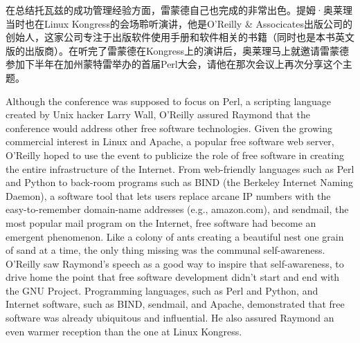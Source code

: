 \ifdefined\chs
在总结托瓦兹的成功管理经验方面，雷蒙德自己也完成的非常出色。提姆·奥莱理当时也在Linux Kongress的会场聆听演讲，他是O'Reilly \& Associcates出版公司的创始人，这家公司专注于出版软件使用手册和软件相关的书籍（同时也是本书英文版的出版商）。在听完了雷蒙德在Kongress上的演讲后，奥莱理马上就邀请雷蒙德参加下半年在加州蒙特雷举办的首届Perl大会，请他在那次会议上再次分享这个主题。
\fi

\ifdefined\eng
Although the conference was supposed to focus on Perl, a scripting language created by Unix hacker Larry Wall, O'Reilly assured Raymond that the conference would address other free software technologies. Given the growing commercial interest in Linux and Apache, a popular free software web server, O'Reilly hoped to use the event to publicize the role of free software in creating the entire infrastructure of the Internet. From web-friendly languages such as Perl and Python to back-room programs such as BIND (the Berkeley Internet Naming Daemon), a software tool that lets users replace arcane IP numbers with the easy-to-remember domain-name addresses (e.g., amazon.com), and sendmail, the most popular mail program on the Internet, free software had become an emergent phenomenon. Like a colony of ants creating a beautiful nest one grain of sand at a time, the only thing missing was the communal self-awareness. O'Reilly saw Raymond's speech as a good way to inspire that self-awareness, to drive home the point that free software development didn't start and end with the GNU Project. Programming languages, such as Perl and Python, and Internet software, such as BIND, sendmail, and Apache, demonstrated that free software was already ubiquitous and influential. He also assured Raymond an even warmer reception than the one at Linux Kongress.
\fi

